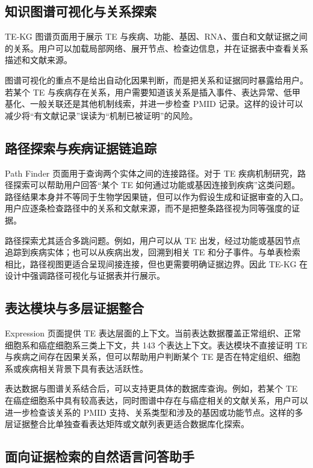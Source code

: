 \documentclass[12pt,a4paper,UTF8]{ctexart}
\begin{document}
\subsection{知识图谱可视化与关系探索}

TE-KG 图谱页面用于展示 TE 与疾病、功能、基因、RNA、蛋白和文献证据之间的关系。用户可以加载局部网络、展开节点、检查边信息，并在证据表中查看关系描述和文献来源。

图谱可视化的重点不是给出自动化因果判断，而是把关系和证据同时暴露给用户。若某个 TE 与疾病存在关系，用户需要知道该关系是插入事件、表达异常、低甲基化、一般关联还是其他机制线索，并进一步检查 PMID 记录。这样的设计可以减少将“有文献记录”误读为“机制已被证明”的风险。

\subsection{路径探索与疾病证据链追踪}

Path Finder 页面用于查询两个实体之间的连接路径。对于 TE 疾病机制研究，路径探索可以帮助用户回答“某个 TE 如何通过功能或基因连接到疾病”这类问题。路径结果本身并不等同于生物学因果链，但可以作为假设生成和证据审查的入口。用户应逐条检查路径中的关系和文献来源，而不是把整条路径视为同等强度的证据。

路径探索尤其适合多跳问题。例如，用户可以从 TE 出发，经过功能或基因节点追踪到疾病实体；也可以从疾病出发，回溯到相关 TE 和分子事件。与单表检索相比，路径视图更适合呈现间接连接，但也更需要明确证据边界。因此 TE-KG 在设计中强调路径可视化与证据表并行展示。

\subsection{表达模块与多层证据整合}

Expression 页面提供 TE 表达层面的上下文。当前表达数据覆盖正常组织、正常细胞系和癌症细胞系三类上下文，共 143 个表达上下文。表达模块不直接证明 TE 与疾病之间存在因果关系，但可以帮助用户判断某个 TE 是否在特定组织、细胞系或疾病相关背景下具有表达活跃性。

表达数据与图谱关系结合后，可以支持更具体的数据库查询。例如，若某个 TE 在癌症细胞系中具有较高表达，同时图谱中存在与癌症相关的文献关系，用户可以进一步检查该关系的 PMID 支持、关系类型和涉及的基因或功能节点。这样的多层证据整合比单独查看表达矩阵或文献列表更适合数据库化探索。

\subsection{面向证据检索的自然语言问答助手}
\end{document}
